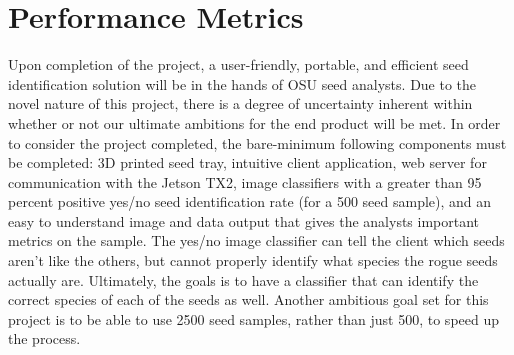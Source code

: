 \documentclass[onecolumn, draftclsnofoot,10pt, compsoc]{IEEEtran}
\begin{document}
\section{Performance Metrics}
Upon completion of the project, a user-friendly, portable, and efficient seed identification solution will be in the hands of OSU seed analysts. Due to the novel nature of this project, there is a degree of uncertainty inherent within whether or not our ultimate ambitions for the end product will be met. In order to consider the project completed, the bare-minimum following components must be completed: 3D printed seed tray, intuitive client application, web server for communication with the Jetson TX2, image classifiers with a greater than 95 percent positive yes/no seed identification rate (for a 500 seed sample), and an easy to understand image and data output that gives the analysts important metrics on the sample. The yes/no image classifier can tell the client which seeds aren't like the others, but cannot properly identify what species the rogue seeds actually are. Ultimately, the goals is to have a classifier that can identify the correct species of each of the seeds as well. Another ambitious goal set for this project is to be able to use 2500 seed samples, rather than just 500, to speed up the process. 
\end{document}
